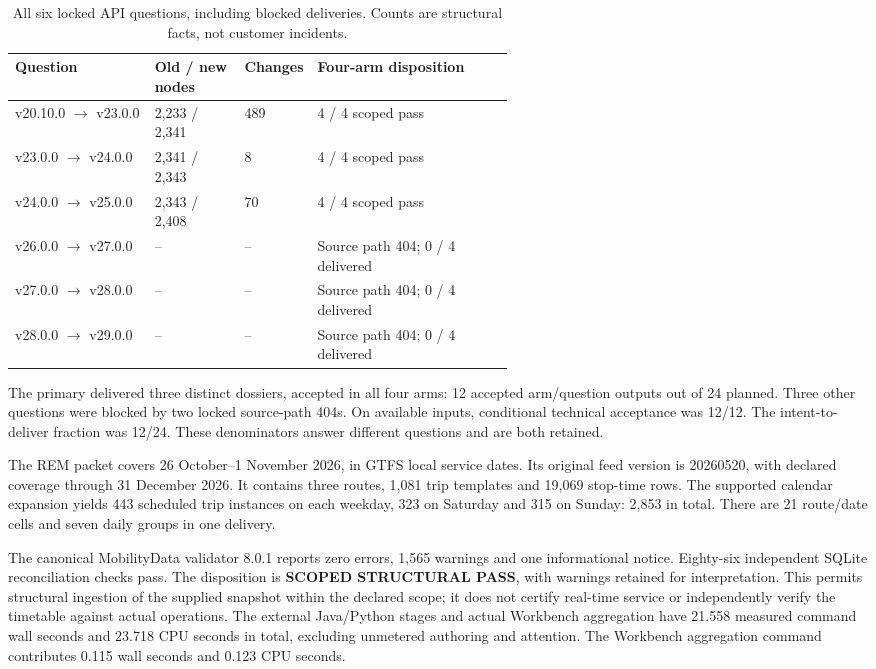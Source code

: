 \begin{table}[htbp]\small
\caption{All six locked API questions, including blocked deliveries. Counts are structural facts, not customer incidents.}
\begin{tabularx}{\linewidth}{@{}p{0.28\linewidth}p{0.18\linewidth}p{0.12\linewidth}Y@{}}
\toprule Question & Old / new nodes & Changes & Four-arm disposition\\ \midrule
v20.10.0 $\rightarrow$ v23.0.0 & 2,233 / 2,341 & 489 & 4 / 4 scoped pass \\
v23.0.0 $\rightarrow$ v24.0.0 & 2,341 / 2,343 & 8 & 4 / 4 scoped pass \\
v24.0.0 $\rightarrow$ v25.0.0 & 2,343 / 2,408 & 70 & 4 / 4 scoped pass \\
v26.0.0 $\rightarrow$ v27.0.0 & -- & -- & Source path 404; 0 / 4 delivered \\
v27.0.0 $\rightarrow$ v28.0.0 & -- & -- & Source path 404; 0 / 4 delivered \\
v28.0.0 $\rightarrow$ v29.0.0 & -- & -- & Source path 404; 0 / 4 delivered \\
\bottomrule\end{tabularx}
\end{table}

The primary delivered three distinct dossiers, accepted in all four arms: 12 accepted arm/question
outputs out of 24 planned. Three other questions were blocked by two locked source-path 404s.
On available inputs, conditional technical acceptance was 12/12. The intent-to-deliver fraction
was 12/24. These denominators answer different questions and are both retained.

The REM packet covers 26 October--1 November 2026, in GTFS local service dates. Its original
feed version is 20260520, with declared coverage through 31 December 2026. It contains three
routes, 1,081 trip templates and 19,069 stop-time rows. The supported calendar expansion yields
443 scheduled trip instances on each weekday, 323 on Saturday and 315 on Sunday: 2,853 in
total. There are 21 route/date cells and seven daily groups in one delivery.

The canonical MobilityData validator 8.0.1 reports zero errors, 1,565 warnings and one informational
notice. Eighty-six independent SQLite reconciliation checks pass. The disposition is
\textbf{SCOPED STRUCTURAL PASS}, with warnings retained for interpretation. This permits
structural ingestion of the supplied snapshot within the declared scope; it does not certify
real-time service or independently verify the timetable against actual operations.
The external Java/Python stages and actual Workbench aggregation have 21.558 measured command
wall seconds and 23.718 CPU seconds in total, excluding unmetered authoring and attention.
The Workbench aggregation command contributes 0.115 wall seconds and 0.123 CPU seconds.
